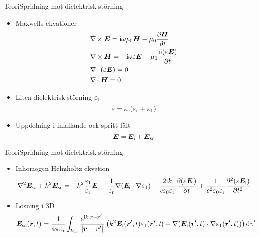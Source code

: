 \documentclass[11pt]{beamer}
\begin{document}
	\begin{frame}{Teori}{Spridning mot dielektrisk störning}
		\begin{itemize}
			\item Maxwells ekvationer
			\begin{align*}
				&\nabla \times \bm{E} = \mathrm{i}\omega \mu_0 \bm{H} - \mu_0 \frac{\partial \bm{H}}{\partial t} \\
				&\nabla \times \bm{H} = -\mathrm{i}\omega \varepsilon \bm{E} + \mu_0 \frac{\partial (\varepsilon \bm{E})}{\partial t} \\
				&\nabla \cdot (\varepsilon \bm{E}) = 0 \\
				&\nabla \cdot \bm{H} = 0
			\end{align*}
			\pause
			\item Liten dielektrisk störning $\varepsilon_1$
			\begin{equation*}
				\varepsilon = \varepsilon_0(\varepsilon_{\mathrm{r}} + \varepsilon_1)
			\end{equation*}
			\pause
			\item Uppdelning i infallande och spritt fält
			\begin{equation*}
				\bm{E} = \bm{E}_{\mathrm{i}} + \bm{E}_{\mathrm{sc}}
			\end{equation*}
		\end{itemize}
	\end{frame}
	
	\begin{frame}{Teori}{Spridning mot dielektrisk störning}
		\begin{itemize}
			\item Inhomogen Helmholtz ekvation
			\footnotesize
			\begin{equation*}
				\nabla^2\bm{E}_{\mathrm{sc}} + k^2 \bm{E}_{\mathrm{sc}} =	-k^2 \frac{\varepsilon_1}{\varepsilon_{\mathrm{r}}} \bm{E}_{\mathrm{i}} -\frac{1}{\varepsilon_{\mathrm{r}}}\nabla(\bm{E}_{\mathrm{i}} \cdot \nabla \varepsilon_1) - \frac{2\mathrm{i} k}{c\varepsilon_0\varepsilon_{\mathrm{r}}} \frac{\partial (\varepsilon \bm{E}_{\mathrm{i}})}{\partial t} + \frac{1}{c^2 \varepsilon_0 \varepsilon_{\mathrm{r}}} \frac{\partial^2 (\varepsilon \bm{E}_{\mathrm{i}})}{\partial t^2}
			\end{equation*}
			\pause
			\normalsize
			\item Lösning i 3D
			\footnotesize
			\begin{equation*}
				\bm{E}_{\mathrm{sc}}(\bm{r},t) = \frac{1}{4\pi\varepsilon_{\mathrm{r}}} \int_{V_{\mathrm{sc}}} \frac{\mathrm{e}^{\mathrm{i} k |\bm{r}-\bm{r'}| }}{ |\bm{r}-\bm{r'}|} \left( k^2 \bm{E}_{\mathrm{i}} (\bm{r'},t) \varepsilon_1 (\bm{r'},t) + \nabla (\bm{E}_{\mathrm{i}} (\bm{r'},t) \cdot \nabla \varepsilon_1 (\bm{r'},t)) \right) \mathrm{d}v'
			\end{equation*}
		\end{itemize}
	\end{frame}
\end{document}
